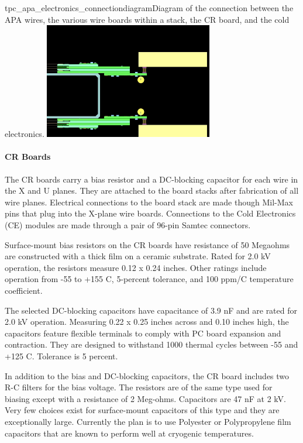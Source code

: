 \begin{cdrfigure}{tpc_apa_electronics_connectiondiagram}{Diagram of the connection between the APA wires, the various wire boards within a stack, the CR board, and the cold electronics}.
\includegraphics[width=0.55\textwidth]{figures/tpc_apa_electronics_connectiondiagram.png}
\end{cdrfigure}

\paragraph{CR Boards}

The CR boards carry a bias resistor and a DC-blocking capacitor for each wire in the X and U planes. They are attached to the board stacks after fabrication of all wire planes.  Electrical connections to the board stack are made though Mil-Max pins that plug into the X-plane wire boards. Connections to the Cold Electronics (CE) modules are made through a pair of 96-pin Samtec connectors.

Surface-mount bias resistors on the CR boards have resistance of 50 Megaohms are constructed with a thick film on a ceramic substrate. Rated for 2.0 kV operation, the resistors measure 0.12 x 0.24 inches. Other ratings include operation from -55 to +155 C, 5-percent tolerance, and 100 ppm/C temperature coefficient.

The selected DC-blocking capacitors have capacitance of 3.9 nF and are rated for 2.0 kV operation. Measuring 0.22 x 0.25 inches across and 0.10 inches high, the capacitors feature flexible terminals to comply with PC board expansion and contraction. They are designed to withstand 1000 thermal cycles between -55 and +125 C. Tolerance is 5 percent.

In addition to the bias and DC-blocking capacitors, the CR board includes two R-C filters for the bias voltage. The resistors are of the same type used for biasing except with a resistance of 2 Meg-ohms. Capacitors are 47 nF at 2 kV. Very few choices exist for surface-mount capacitors of this type and they are exceptionally large. Currently the plan is to use Polyester or Polypropylene film capacitors that are known to perform well at cryogenic temperatures.

